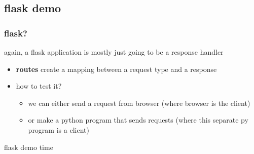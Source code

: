 \documentclass{beamer}
\begin{document}
\subsection{flask demo}
\begin{frame}
\frametitle{flask?}
\begin{block}{\textbf{}}
  again, a flask application is mostly just going
  to be a response handler
  \begin{itemize}
    \item \textbf{routes} create a mapping
          between a request type and a response
    \item how to test it?
          \begin{itemize}
            \item we can either send a request from browser (where
                  browser is the client)
            \item or make a python program that sends requests (where
                  this separate py program is a client)
          \end{itemize}
  \end{itemize}


\end{block}
\end{frame}


\begin{frame}
\begin{center}
\Huge flask demo time
\end{center}
\end{frame}
\end{document}
